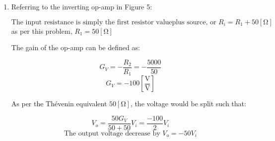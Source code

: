 \begin{enumerate}
  \item Referring to the inverting op-amp in Figure 5:

    \begin{center}
      $$\boxed{\text{The input resistance is simply the first resistor valueplus source, or }R_i=R_1+50[\si{\ohm}]}$$ as per this problem, $R_1=50[\si{\ohm}]$
    \end{center}

    \begin{center}
      The gain of the op-amp can be defined as:
    \end{center}
    $$G_V=-\frac{R_2}{R_1}=-\frac{5000}{50}$$
    $$\boxed{G_V=-100\left[ \frac{\si{\volt}}{\si{\volt}} \right]}$$

    \begin{center}
      As per the Th\'evenin equivalent $50[\si{\ohm}]$, the voltage would be split such that:
    \end{center}
    $$V_o=\frac{50G_V}{50+50}V_i=\frac{-100}{2}V_i$$
    $$\boxed{\text{The output voltage decrease by }V_o=-50V_i}$$

\end{enumerate}



